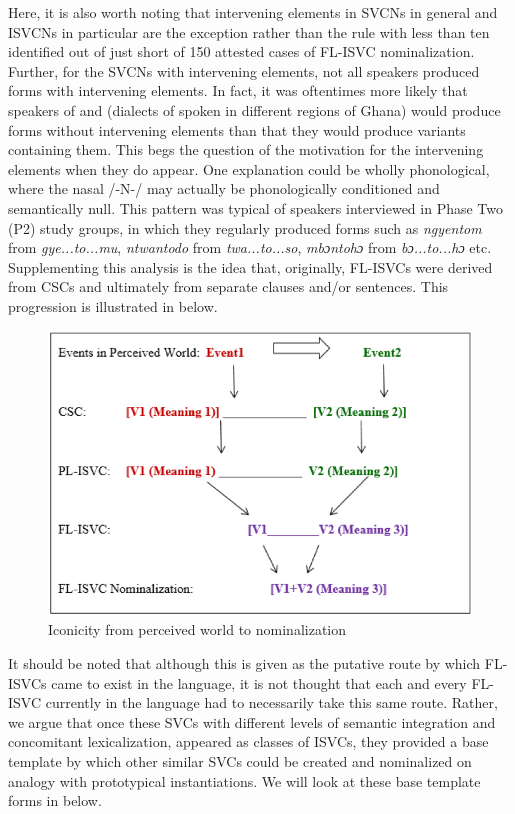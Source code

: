 \documentclass[output=paper]{../langsci/langscibook}
\begin{document}
Here, it is also worth noting that intervening elements in SVCNs in general and ISVCNs in particular are the exception rather than the rule with less than ten identified out of just short of 150 attested cases of FL-ISVC nominalization. Further, for the SVCNs with intervening elements, not all speakers produced forms with intervening elements. In fact, it was oftentimes more likely that speakers of  and  (dialects of  spoken in different regions of Ghana) would produce forms without intervening elements than that they would produce variants containing them. This begs the question of the motivation for the intervening elements when they do appear. One explanation could be wholly phonological, where the nasal /-N-/ may actually be phonologically conditioned and semantically null. This pattern was typical of  speakers interviewed in Phase Two (P2) study groups, in which they regularly produced forms such as \textit{ngyentom} from \textit{gye...to...mu}, \textit{ntwantodo} from \textit{twa...to...so}, \textit{mbɔntohɔ} from \textit{bɔ...to...hɔ} etc. Supplementing this analysis is the idea that, originally, FL-ISVCs were derived from CSCs and ultimately from separate clauses and/or sentences. This progression is illustrated in  below. 

\begin{figure}
\includegraphics[width=\textwidth]{fig-duah-1}
\caption{Iconicity from perceived world to nominalization \citep[41]{kambon2012}}
\label{fig:duah:2}
\end{figure}

It should be noted that although this is given as the putative route by which FL-ISVCs came to exist in the language, it is not thought that each and every FL-ISVC currently in the language had to necessarily take this same route. Rather, we argue that once these SVCs with different levels of semantic integration and concomitant lexicalization, appeared as classes of ISVCs, they provided a base template by which other similar SVCs could be created and nominalized on analogy with prototypical instantiations. We will look at these base template forms in  below.
\end{document}
